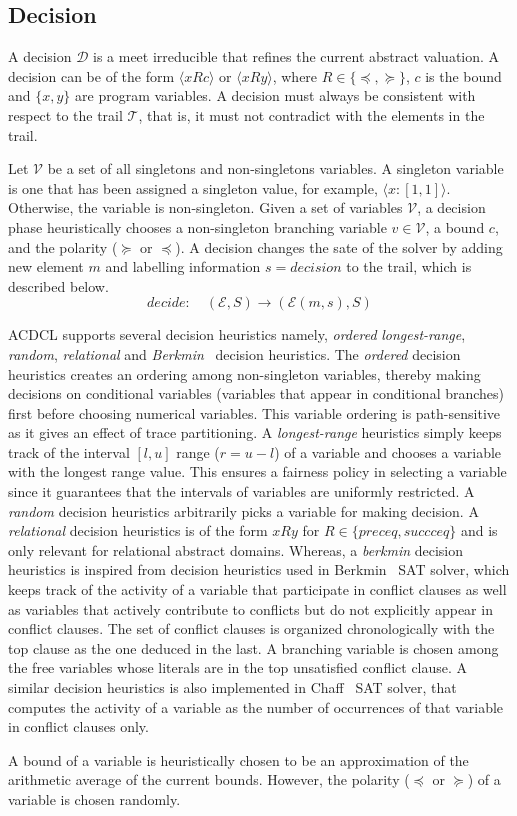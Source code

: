 \subsection{Decision}
A decision $\mathcal{D}$ is a meet irreducible that refines the 
current abstract valuation.  A decision can be of the form 
$\langle x R c \rangle$ or $\langle x R y \rangle$, where 
$R \in \{\preceq, \succeq\}$, $c$ is the bound and 
$\{x, y\}$ are program variables.  A decision must always 
be consistent with respect to the trail $\mathcal{T}$, that 
is, it must not contradict with the elements in the trail.  

Let $\mathcal{V}$ be a set of all singletons and non-singletons 
variables.  A singleton variable is one that has been assigned a 
singleton value, for example, $\langle x:[1,1] \rangle$.  Otherwise, 
the variable is non-singleton.  Given a set of variables $\mathcal{V}$, 
a decision phase heuristically chooses a non-singleton branching 
variable $v \in \mathcal{V}$, a bound $c$, and the polarity ($\succeq$ or 
$\preceq$).  A decision changes the sate of the solver by adding new element 
$m$ and labelling information $s=decision$ to the trail, which is described below. 
\[decide: \quad (\mathcal{E},S) \rightarrow (\mathcal{E}(m,s),S) \]

ACDCL supports several decision heuristics namely, {\em ordered} 
{\em longest-range}, {\em random}, {\em relational} and 
{\em Berkmin}~\cite{eugoldberg07} decision heuristics.  
The {\em ordered} decision heuristics creates an ordering among non-singleton 
variables, thereby making decisions on conditional variables (variables that 
appear in conditional branches) first before choosing numerical variables.  
This variable ordering is path-sensitive as it gives an effect of trace
partitioning.  A {\em longest-range} heuristics simply keeps track of the
interval $[l,u]$ range ($r=u-l$) of a variable and chooses a variable with 
the longest range value.  This ensures a fairness policy in selecting a 
variable since it guarantees that the intervals of variables are uniformly 
restricted.  A {\em random} decision heuristics arbitrarily picks a variable 
for making decision.  A {\em relational} decision heuristics is of the form 
$x R y$ for $R \in \{preceq, succceq\}$ and is only relevant for relational 
abstract domains.  Whereas, a {\em berkmin} decision heuristics is inspired 
from decision heuristics used in Berkmin~\cite{eugoldberg07} SAT solver, which 
keeps track of the activity of a variable that participate in conflict clauses 
as well as variables that actively contribute to conflicts but do not explicitly 
appear in conflict clauses.  The set of conflict clauses is organized 
chronologically with the top clause as the one deduced in the last.  A 
branching variable is chosen among the free variables whose literals are 
in the top unsatisfied conflict clause.  A similar decision heuristics is 
also implemented in Chaff~\cite{chaff} SAT solver, that computes the activity 
of a variable as the number of occurrences of that variable in conflict 
clauses only.  

A bound of a variable is heuristically chosen to be an approximation of the 
arithmetic average of the current bounds.  However, the polarity ($\preceq$ or
$\succeq$) of a variable is chosen randomly.  
